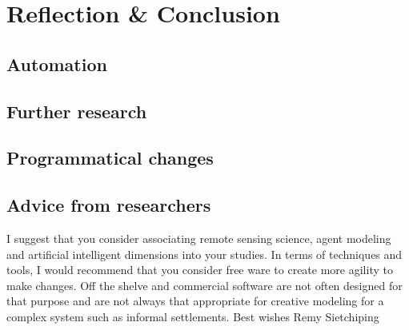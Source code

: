 
\chapter{Reflection \& Conclusion} %
\label{Chapter5} %
\section{Automation}
\section{Further research}
\section{Programmatical changes}

\section{Advice from researchers}
I suggest that you consider associating remote sensing science, agent modeling  and artificial intelligent dimensions into your studies. In terms of techniques and tools, I would recommend that you consider free ware to create more agility to make changes. Off the shelve and commercial software are not often designed for that purpose and are not always that appropriate for creative modeling for a complex system such as informal settlements. 
Best wishes
Remy Sietchiping